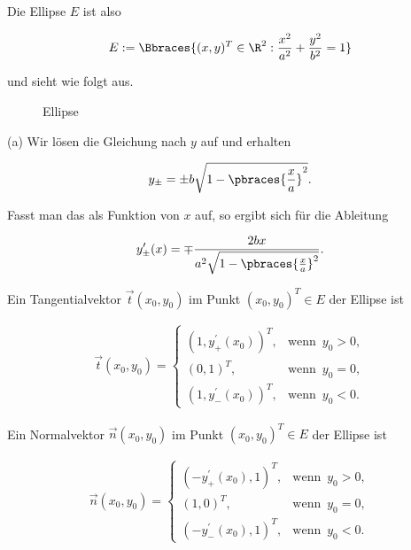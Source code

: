 \begin{solution}

Die Ellipse $E$ ist also

\begin{align*}
  E :=
  \Bbraces
  {
    (x, y)^T \in \R^2:
    \frac{x^2}{a^2} + \frac{y^2}{b^2} = 1
  }
\end{align*}

und sieht wie folgt aus.

\begin{figure}[h!]
  \centering
  
  \caption{Ellipse}
\end{figure}

(a) Wir lösen die Gleichung nach $y$ auf und erhalten

\begin{align*}
  y_\pm = \pm b \sqrt{1 - \pbraces{\frac{x}{a}}^2}.
\end{align*}

Fasst man das als Funktion von $x$ auf, so ergibt sich für die Ableitung

\begin{align*}
  y^\prime_{\pm}(x)
  =
  \mp \frac{2bx}{a^2 \sqrt{1 - \pbraces{\frac{x}{a}}^2}}.
\end{align*}

Ein Tangentialvektor $\vec{t}(x_0, y_0)$ im Punkt $(x_0, y_0)^T \in E$ der Ellipse ist

\begin{align*}
  \vec{t}(x_0, y_0)
  =
  \begin{cases}
    (1, y_+^\prime(x_0))^T,
    & \text{wenn} \enspace y_0 > 0, \\
    (0, 1)^T,
    & \text{wenn} \enspace y_0 = 0, \\
    (1, y_-^\prime(x_0))^T,
    & \text{wenn} \enspace y_0 < 0.
  \end{cases}
\end{align*}

Ein Normalvektor $\vec{n}(x_0, y_0)$ im Punkt $(x_0, y_0)^T \in E$ der Ellipse ist

\begin{align*}
  \vec{n}(x_0, y_0)
  =
  \begin{cases}
    (-y_+^\prime(x_0), 1)^T,
    & \text{wenn} \enspace y_0 > 0, \\
    (1, 0)^T,
    & \text{wenn} \enspace y_0 = 0, \\
    (-y_-^\prime(x_0), 1)^T,
    & \text{wenn} \enspace y_0 < 0.
  \end{cases}
\end{align*}


\end{solution}
